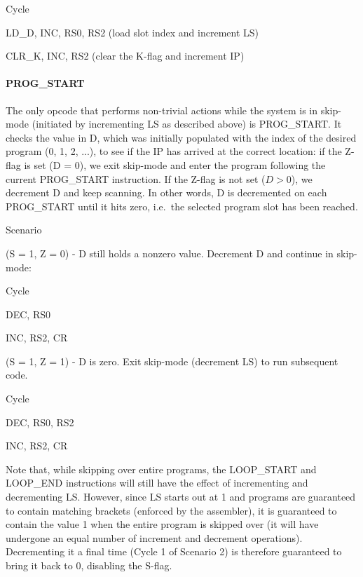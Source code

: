 \begin{labeledenum}{Cycle}  
\item  LD\_D, INC, RS0, RS2 (load slot index and increment LS)
\item  CLR\_K, INC, RS2 (clear the K-flag and increment IP)
\end{labeledenum}

\paragraph{PROG\_START}
The only opcode that performs non-trivial actions while the system is in skip-mode (initiated by incrementing LS as described above) is PROG\_START. It checks the value in D, which was initially populated with the index of the desired program (0, 1, 2, ...), to see if the IP has arrived at the correct location: if the Z-flag is set (D = 0), we exit skip-mode and enter the program following the current PROG\_START instruction. If the Z-flag is not set ($D > 0$), we decrement D and keep scanning. In other words, D is decremented on each PROG\_START until it hits zero, i.e.~the selected program slot has been reached.

\begin{labeledenum}{Scenario}
  \item (S = 1, Z = 0) - D still holds a nonzero value. Decrement D and continue in skip-mode:
  \begin{labeledenum}{Cycle}
  \item DEC, RS0
  \item INC, RS2, CR
  \end{labeledenum}

  \item (S = 1, Z = 1) - D is zero. Exit skip-mode (decrement LS) to run subsequent code.
  \begin{labeledenum}{Cycle}
  \item DEC, RS0, RS2
  \item INC, RS2, CR
  \end{labeledenum}
\end{labeledenum}

Note that, while skipping over entire programs, the LOOP\_START and LOOP\_END instructions will still have the effect of incrementing and decrementing LS. However, since LS starts out at 1 and programs are guaranteed to contain matching brackets (enforced by the assembler), it is guaranteed to contain the value 1 when the entire program is skipped over (it will have undergone an equal number of increment and decrement operations). Decrementing it a final time (Cycle 1 of Scenario 2) is therefore guaranteed to bring it back to 0, disabling the S-flag.

